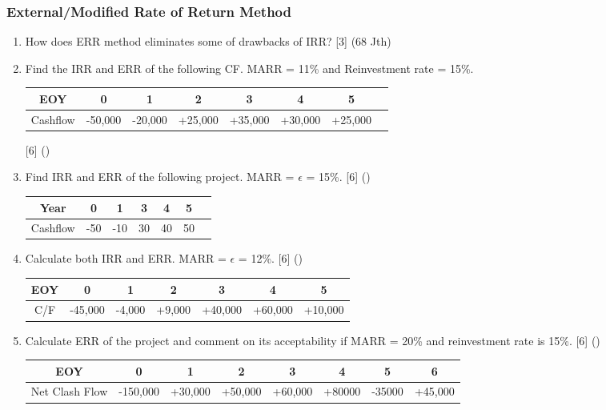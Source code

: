 \documentclass[12pt]{article}
\begin{document}
		\subsubsection{External/Modified Rate of Return Method}
			\begin{enumerate}[topsep = 0pt]
				\item How does ERR method eliminates some of drawbacks of IRR? \hfill [3] (68 Jth)
				
				\item Find the IRR and ERR of the following CF. MARR = 11\% and Reinvestment rate = 15\%.
				\begin{tabular}{|c|c|c|c|c|c|c|c|}
					\hline
					EOY & 0 & 1 & 2 & 3 & 4 & 5\\ \hline
					Cashflow & -50,000 & -20,000 & +25,000 & +35,000 & +30,000 & +25,000\\ \hline
				\end{tabular} \hfill [6] ()

				\item Find IRR and ERR of the following project. MARR = $\epsilon$ = 15\%. \hfill [6] ()
				\begin{tabular}{|c|c|c|c|c|c|c|}
					\hline
					Year & 0 & 1 & 3 & 4 & 5\\ \hline
					Cashflow & -50 & -10 & 30 & 40 & 50\\ \hline
				\end{tabular}
				
				\item Calculate both IRR and ERR. MARR = $\epsilon$ = 12\%. \hfill [6] ()
				\begin{tabular}{|c|c|c|c|c|c|c|}
					\hline
					EOY & 0 & 1 & 2 & 3 & 4 & 5\\ \hline
					C/F & -45,000 & -4,000 & +9,000 & +40,000 & +60,000 & +10,000 \\ \hline
				\end{tabular}

				\item Calculate ERR of the project and comment on its acceptability if MARR = 20\% and reinvestment rate is 15\%. \hfill [6] ()
				\begin{tabular}{|c|c|c|c|c|c|c|c|}
					\hline
					EOY & 0 & 1 & 2 & 3 & 4 & 5 & 6\\ \hline
					Net Clash Flow & -150,000 & +30,000 & +50,000 & +60,000 & +80000 & -35000 & +45,000\\ 
					\hline
				\end{tabular}
				

\end{enumerate}
\end{document}
